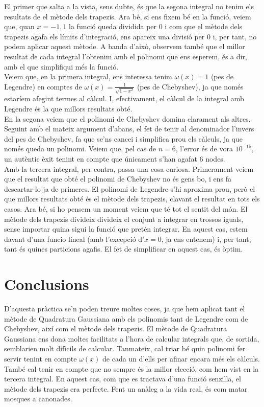 \documentclass[a4paper,11pt]{article}
\begin{document}
El primer que salta a la vista, sens dubte, és que la segona integral no tenim els resultats de el mètode dels trapezis. Ara bé, si ens fixem bé en la funció, veiem que, quan $x = -1, 1$ la funció queda dividida per $0$ i com que el mètode dels trapezis agafa els límits d'integració, ens apareix una divisió per $0$ i, per tant, no podem aplicar aquest mètode. A banda d'això, observem també que el millor resultat de cada integral l'obtenim amb el polinomi que ens esperem, és a dir, amb el que simplifiqui més la funció.\\
Veiem que, en la primera integral, ens interessa tenim $\omega(x) = 1$ (pes de Legendre) en comptes de $\omega(x) = \frac{1}{\sqrt{1-x^2}}$ (pes de Chebyshev), ja que només estaríem afegint termes al càlcul. I, efectivament, el càlcul de la integral amb Legendre és la que millors resultats obté.\\
En la segona veiem que el polinomi de Chebyshev domina clarament als altres. Seguint amb el mateix argument d'abans, el fet de tenir al denominador l'invers del pes de Chebyshev, fa que se'ns cance\lgem i i simplifica prou els càlculs, ja que només queda un polinomi. Veiem que, pel cas de $n = 6$, l'error és de vora $10^{-15}$, un autèntic èxit tenint en compte que únicament s'han agafat 6 nodes.\\
Amb la tercera integral, per contra, passa una cosa curiosa. Primerament veiem que el resultat que obté el polinomi de Chebyshev no és gens bo, i ens fa descartar-lo ja de primeres. El polinomi de Legendre s'hi aproxima prou, però el que millors resultats obté és el mètode dels trapezis, clavant el resultat en tots els casos. Ara bé, si ho pensem un moment veiem que té tot el sentit del món. El mètode dels trapezis divideix divideix el conjunt a integrar en trossos iguals, sense importar quina sigui la funció que pretén integrar. En aquest cas, estem davant d'una funcio lineal (amb l'excepció d'$x = 0$, ja ens entenem) i, per tant, tant és quines particions agafis. El fet de simplificar en aquest cas, és òptim.
\section*{Conclusions}
D'aquesta pràctica se'n poden treure moltes coses, ja que hem aplicat tant el mètode de Quadratura Gaussiana amb els polinomis tant de Legendre com de Chebyshev, així com el mètode dels trapezis. El mètode de Quadratura Gaussiana ens dona moltes facilitats a l'hora de calcular integrals que, de sortida, semblarien molt difícils de calcular. Tanmateix, cal triar bé quin polinomi fer servir tenint en compte $\omega(x)$ de cada un d'ells per afinar encara més els càlculs. També cal tenir en compte que no sempre és la millor elecció, com hem vist en la tercera integral. En aquest cas, com que es tractava d'una funció senzilla, el mètode dels trapezis era perfecte. Fent un anàleg a la vida real, és com matar mosques a canonades.
\end{document}
